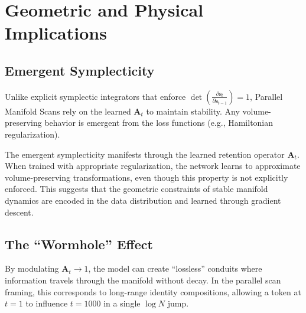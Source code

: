\documentclass[12pt,a4paper]{article}
\newcommand{\bA}{\mathbf{A}}
\newcommand{\bs}{\mathbf{s}}
\DeclareMathOperator{\det}{det}
\begin{document}
\section{Geometric and Physical Implications}

\subsection{Emergent Symplecticity}

Unlike explicit symplectic integrators that enforce $\det\left(\frac{\partial \bs_t}{\partial \bs_{t-1}}\right) = 1$, Parallel Manifold Scans rely on the learned $\bA_t$ to maintain stability. Any volume-preserving behavior is emergent from the loss functions (e.g., Hamiltonian regularization).

The emergent symplecticity manifests through the learned retention operator $\bA_t$. When trained with appropriate regularization, the network learns to approximate volume-preserving transformations, even though this property is not explicitly enforced. This suggests that the geometric constraints of stable manifold dynamics are encoded in the data distribution and learned through gradient descent.

\subsection{The ``Wormhole'' Effect}

By modulating $\bA_t \to 1$, the model can create ``lossless'' conduits where information travels through the manifold without decay. In the parallel scan framing, this corresponds to long-range identity compositions, allowing a token at $t=1$ to influence $t=1000$ in a single $\log N$ jump.
\end{document}

